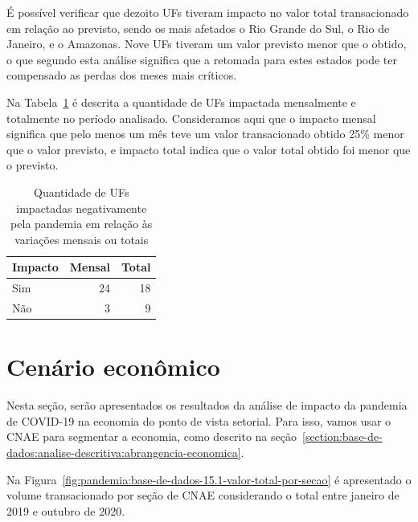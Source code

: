 É possível verificar que dezoito UFs tiveram impacto no valor total transacionado em relação ao previsto, sendo os mais afetados o Rio Grande do Sul, o Rio de Janeiro, e o Amazonas. Nove UFs tiveram um valor previsto menor que o obtido, o que segundo esta análise significa que a retomada para estes estados pode ter compensado as perdas dos meses mais críticos.

Na Tabela~\ref{tab:pandemia:impacto-por-uf} é descrita a quantidade de UFs impactada mensalmente e totalmente no período analisado. Consideramos aqui que o impacto mensal significa que pelo menos um mês teve um valor transacionado obtido 25\% menor que o valor previsto, e impacto total indica que o valor total obtido foi menor que o previsto.

\begin{table}[htb]
\centering
\caption{Quantidade de UFs impactadas negativamente pela pandemia em relação às variações mensais ou totais}
\label{tab:pandemia:impacto-por-uf}
    \begin{tabular}{l|r|r}
        \toprule
        Impacto & Mensal & Total \\
        \midrule
        Sim & 24 & 18 \\
        Não &  3 &  9 \\
        \bottomrule
    \end{tabular}
\fdadospesquisa
\end{table}

\section{Cenário econômico}
\label{section:impacto:cenario-economico}

Nesta seção, serão apresentados os resultados da análise de impacto da pandemia de COVID-19 na economia do ponto de vista setorial. Para isso, vamos usar o CNAE para segmentar a economia, como descrito na seção~\ref{section:base-de-dados:analise-descritiva:abrangencia-economica}.

Na Figura~\ref{fig:pandemia:base-de-dados-15.1-valor-total-por-secao} é apresentado o volume transacionado por seção de CNAE considerando o total entre janeiro de 2019 e outubro de 2020.

